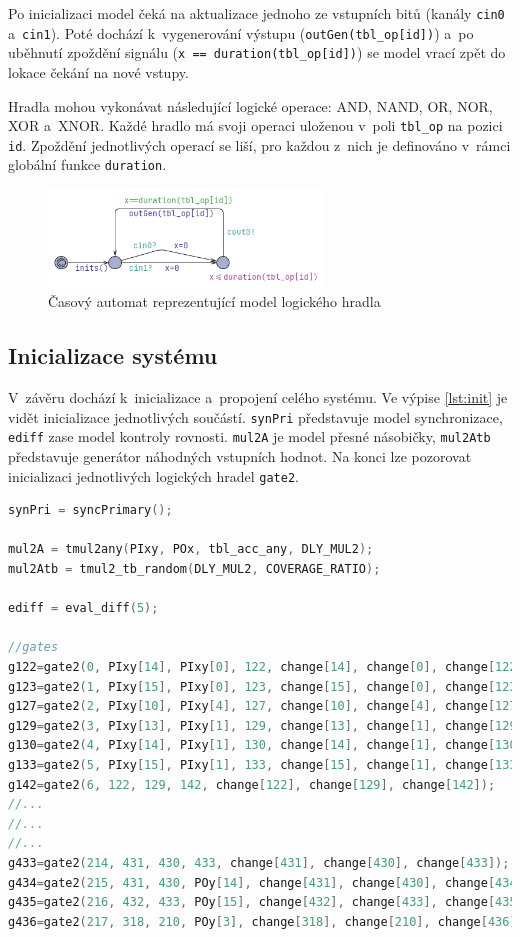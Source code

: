 Po inicializaci model čeká na aktualizace jednoho ze vstupních bitů (kanály \texttt{cin0} a~\texttt{cin1}). Poté dochází k~vygenerování výstupu (\texttt{outGen(tbl\_op[id])}) a~po uběhnutí zpoždění signálu (\texttt{x == duration(tbl\_op[id])}) se model vrací zpět do lokace čekání na nové vstupy.

Hradla mohou vykonávat následující logické operace: AND, NAND, OR, NOR, XOR a~XNOR. Každé hradlo má svoji operaci uloženou v~poli \texttt{tbl\_op} na pozici \texttt{id}. Zpoždění jednotlivých operací se liší, pro každou z~nich je definováno v~rámci globální funkce \texttt{duration}.

\begin{figure}[H]
    \centering
    \includegraphics[width=0.65\textwidth]{obrazky-figures/model_gate2.png}
    \caption{Časový automat reprezentující model logického hradla}
    \label{fig:model_gate2}
\end{figure}

\subsection{Inicializace systému}
V~závěru dochází k~inicializace a~propojení celého systému. Ve výpise \ref{lst:init} je vidět inicializace jednotlivých součástí. \texttt{synPri} představuje model synchronizace, \texttt{ediff} zase model kontroly rovnosti. \texttt{mul2A} je model přesné násobičky, \texttt{mul2Atb} představuje generátor náhodných vstupních hodnot. Na konci lze pozorovat inicializaci jednotlivých logických hradel \texttt{gate2}.

\begin{lstlisting}[language={C}, caption={Inicializace systému}, label={lst:init}]
synPri = syncPrimary();

mul2A = tmul2any(PIxy, POx, tbl_acc_any, DLY_MUL2);
mul2Atb = tmul2_tb_random(DLY_MUL2, COVERAGE_RATIO);

ediff = eval_diff(5);

//gates
g122=gate2(0, PIxy[14], PIxy[0], 122, change[14], change[0], change[122]);
g123=gate2(1, PIxy[15], PIxy[0], 123, change[15], change[0], change[123]);
g127=gate2(2, PIxy[10], PIxy[4], 127, change[10], change[4], change[127]);
g129=gate2(3, PIxy[13], PIxy[1], 129, change[13], change[1], change[129]);
g130=gate2(4, PIxy[14], PIxy[1], 130, change[14], change[1], change[130]);
g133=gate2(5, PIxy[15], PIxy[1], 133, change[15], change[1], change[133]);
g142=gate2(6, 122, 129, 142, change[122], change[129], change[142]);
//...
//...
//...
g433=gate2(214, 431, 430, 433, change[431], change[430], change[433]);
g434=gate2(215, 431, 430, POy[14], change[431], change[430], change[434]);
g435=gate2(216, 432, 433, POy[15], change[432], change[433], change[435]);
g436=gate2(217, 318, 210, POy[3], change[318], change[210], change[436]);
\end{lstlisting}

